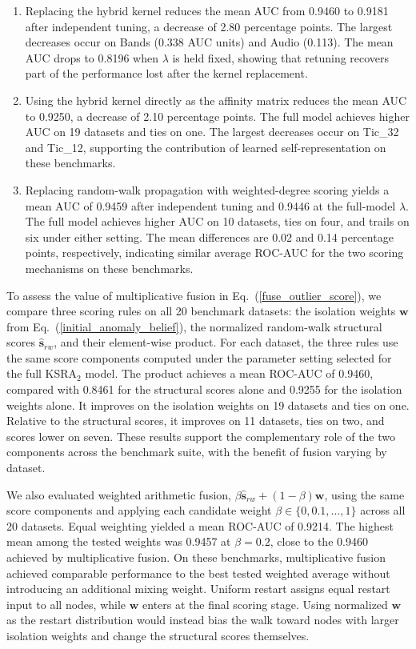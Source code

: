 \documentclass[ASNA,twocolumn]{USG} %
\begin{document}
\begin{enumerate}[\indent (1)]
    \item Replacing the hybrid kernel reduces the mean AUC from 0.9460 to 0.9181 after independent tuning, a decrease of 2.80 percentage points. The largest decreases occur on Bands (0.338 AUC units) and Audio (0.113). The mean AUC drops to 0.8196 when $\lambda$ is held fixed, showing that retuning recovers part of the performance lost after the kernel replacement.

    \item Using the hybrid kernel directly as the affinity matrix reduces the mean AUC to 0.9250, a decrease of 2.10 percentage points. The full model achieves higher AUC on 19 datasets and ties on one. The largest decreases occur on Tic\_32 and Tic\_12, supporting the contribution of learned self-representation on these benchmarks.

    \item Replacing random-walk propagation with weighted-degree scoring yields a mean AUC of 0.9459 after independent tuning and 0.9446 at the full-model $\lambda$. The full model achieves higher AUC on 10 datasets, ties on four, and trails on six under either setting. The mean differences are 0.02 and 0.14 percentage points, respectively, indicating similar average ROC-AUC for the two scoring mechanisms on these benchmarks.
\end{enumerate}

To assess the value of multiplicative fusion in Eq.~(\ref{fuse_outlier_score}), we compare three scoring rules on all 20 benchmark datasets: the isolation weights $\boldsymbol{w}$ from Eq.~(\ref{initial_anomaly_belief}), the normalized random-walk structural scores $\hat{\boldsymbol{s}}_{rw}$, and their element-wise product. For each dataset, the three rules use the same score components computed under the parameter setting selected for the full KSRA$_2$ model. The product achieves a mean ROC-AUC of 0.9460, compared with 0.8461 for the structural scores alone and 0.9255 for the isolation weights alone. It improves on the isolation weights on 19 datasets and ties on one. Relative to the structural scores, it improves on 11 datasets, ties on two, and scores lower on seven. These results support the complementary role of the two components across the benchmark suite, with the benefit of fusion varying by dataset. 

We also evaluated weighted arithmetic fusion, $\beta\hat{\boldsymbol{s}}_{rw}+(1-\beta)\boldsymbol{w}$, using the same score components and applying each candidate weight $\beta\in\{0,0.1,\ldots,1\}$ across all 20 datasets. Equal weighting yielded a mean ROC-AUC of 0.9214. The highest mean among the tested weights was 0.9457 at $\beta=0.2$, close to the 0.9460 achieved by multiplicative fusion. On these benchmarks, multiplicative fusion achieved comparable performance to the best tested weighted average without introducing an additional mixing weight. Uniform restart assigns equal restart input to all nodes, while $\boldsymbol{w}$ enters at the final scoring stage. Using normalized $\boldsymbol w$ as the restart distribution would instead bias the walk toward nodes with larger isolation weights and change the structural scores themselves.
\end{document}
